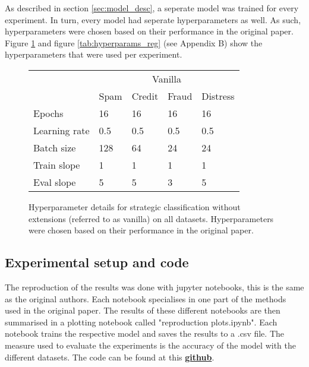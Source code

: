 As described in section \ref{sec:model_desc}, a seperate model was trained for every experiment. In turn, every model had seperate hyperparameters as well. As such, hyperparameters were chosen based on their performance in the original paper. Figure \ref{tab:hyperparams_vanilla} and figure \ref{tab:hyperparams_reg} (see Appendix B) show the hyperparameters that were used per experiment.
\begin{figure}[h]
    \centering
\begin{tabular}{l|llll|}
\cline{2-5}
                                    & \multicolumn{4}{c|}{Vanilla}                                                                   \\ \cline{2-5} 
                                    & \multicolumn{1}{l|}{Spam} & \multicolumn{1}{l|}{Credit} & \multicolumn{1}{l|}{Fraud} & Distress \\ \hline
\multicolumn{1}{|l|}{Epochs}        & \multicolumn{1}{l|}{16}     & \multicolumn{1}{l|}{16}       & \multicolumn{1}{l|}{16}    & 16   \\ \hline
\multicolumn{1}{|l|}{Learning rate} & \multicolumn{1}{l|}{0.5}    & \multicolumn{1}{l|}{0.5}      & \multicolumn{1}{l|}{0.5}   & 0.5  \\ \hline
\multicolumn{1}{|l|}{Batch size}    & \multicolumn{1}{l|}{128}     & \multicolumn{1}{l|}{64}       & \multicolumn{1}{l|}{24}    & 24  \\ \hline
\multicolumn{1}{|l|}{Train slope}   & \multicolumn{1}{l|}{1}      & \multicolumn{1}{l|}{1}        & \multicolumn{1}{l|}{1}     & 1    \\ \hline
\multicolumn{1}{|l|}{Eval slope}    & \multicolumn{1}{l|}{5}      & \multicolumn{1}{l|}{5}        & \multicolumn{1}{l|}{3}     & 5    \\ \hline
\end{tabular}
    \caption{Hyperparameter details for strategic classification without extensions (referred to as vanilla) on all datasets. Hyperparameters were chosen based on their performance in the original paper.}
    \label{tab:hyperparams_vanilla}
\end{figure}

\subsection{Experimental setup and code}
The reproduction of the results was done with jupyter notebooks, this is the same as the original authors. Each notebook specialises in one part of the methods used in the original paper. The results of these different notebooks are then summarised in a plotting notebook called "reproduction plots.ipynb". Each notebook trains the respective model and saves the results to a .csv file. The measure used to evaluate the experiments is the accuracy of the model with the different datasets. The code can be found at this \href{https://anonymous.4open.science/r/Strategic_classification_made_practical_reproduce_91BD/README.md}{\textbf{github}}.

